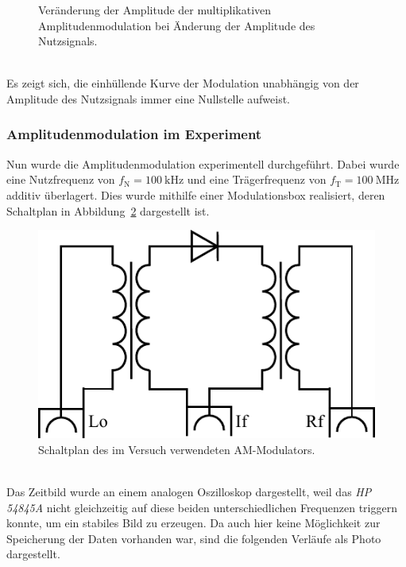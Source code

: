 \documentclass[a4paper,twoside,final]{article}
\begin{document}
\begin{figure}[htp]
\begin{subfigure}{0.45\textwidth}
    \end{subfigure}
    \caption{Veränderung der Amplitude der multiplikativen Amplitudenmodulation bei Änderung der Amplitude des Nutzsignals.}
    \label{fig:AM2_multiplikativ}
\end{figure}\\
Es zeigt sich, die einhüllende Kurve der Modulation unabhängig von der Amplitude des Nutzsignals immer eine Nullstelle aufweist.
\FloatBarrier
\subsubsection{Amplitudenmodulation im Experiment}
Nun wurde die Amplitudenmodulation experimentell durchgeführt. Dabei wurde eine Nutzfrequenz von $f_\text{N} = \SI{100}{\kilo\hertz}$ und eine Trägerfrequenz von $f_\text{T} = \SI{100}{\mega\hertz}$ additiv überlagert. Dies wurde mithilfe einer Modulationsbox realisiert, deren Schaltplan in Abbildung~\ref{fig:AM_Modulator} dargestellt ist.
\begin{figure}[htp]
  \centering
  \includegraphics{Schaltungen/AM-Modulator.pdf}
  \caption{Schaltplan des im Versuch verwendeten AM-Modulators.}
  \label{fig:AM_Modulator}
\end{figure}\\
Das Zeitbild wurde an einem analogen Oszilloskop dargestellt, weil das \textit{HP 54845A} nicht gleichzeitig auf diese beiden unterschiedlichen Frequenzen triggern konnte, um ein stabiles Bild zu erzeugen. Da auch hier keine Möglichkeit zur Speicherung der Daten vorhanden war, sind die folgenden Verläufe als Photo dargestellt.
\end{document}
